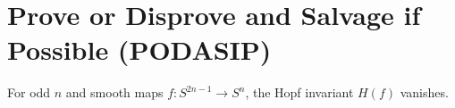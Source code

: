\documentclass{homework}
\begin{document}
\section{Prove or Disprove and Salvage if Possible (PODASIP)}

\begin{problem} For odd $n$ and smooth maps $f : S^{2n-1} \to S^n$,
the Hopf invariant $H(f)$ vanishes.
\end{problem}
\end{document}
